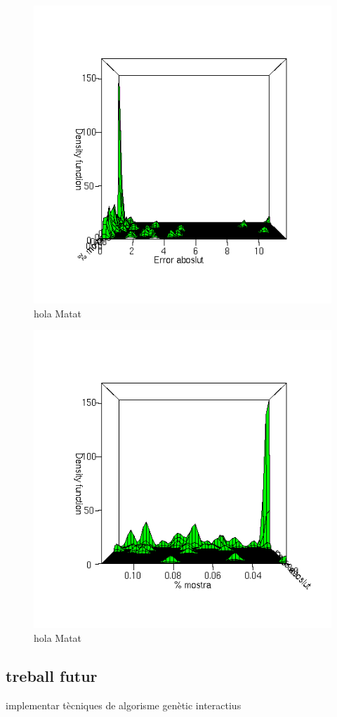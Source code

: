 \documentclass[titlepage,a4paper,12pt]{book}
\begin{document}
	\begin{figure}[tbp]
		\begin{center}
			\includegraphics[scale=0.75]{chiron/rgrau3.png}
		\end{center}
		\caption{hola Matat}
		\label{fig:resChir3}
	\end{figure}
	\begin{figure}[tbp]
		\begin{center}
			\includegraphics[scale=0.75]{chiron/rgrau4.png}
		\end{center}
		\caption{hola Matat}
		\label{fig:resChir4}
	\end{figure}

	\subsection{treball futur} %
	\label{sub:treball futur}
	implementar tècniques de algorisme genètic  interactius
	
\end{document}

